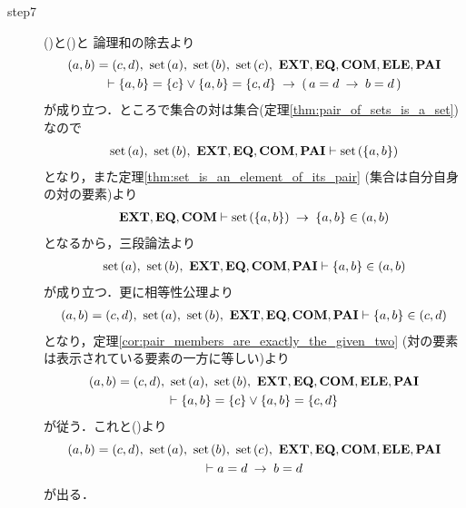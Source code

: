\begin{sketch}
\begin{description}
			\item[step7] ()と()と
				論理和の除去より
				\begin{align}
					\begin{gathered}
						(a,b) = (c,d),\ \set{a},\ \set{b},\ \set{c},\ \EXTAX,\EQAX,\COMAX,\ELEAX,\PAIAX \\
						\vdash \{a,b\} = \{c\} \vee \{a,b\} = \{c,d\} \rarrow (\, a = d \rarrow b = d\, )
					\end{gathered}
					\label{fom:equality_of_ordered_pairs_13}
				\end{align}
				が成り立つ．ところで集合の対は集合(定理\ref{thm:pair_of_sets_is_a_set})なので
				\begin{align}
					\operatorname*{set}\hspace{0.15em}(a),\ \operatorname*{set}\hspace{0.15em}(b),\ \mbox{{\bf EXT}},\mbox{{\bf EQ}},\mbox{\bf COM},\mbox{{\bf PAI}} \vdash \operatorname*{set}\hspace{0.15em}(\{a,b\})
				\end{align}
				となり，また定理\ref{thm:set_is_an_element_of_its_pair} (集合は自分自身の対の要素)より
				\begin{align}
					\mbox{{\bf EXT}},\mbox{{\bf EQ}},\mbox{\bf COM} \vdash \operatorname*{set}\hspace{0.15em}(\{a,b\}) \hspace{0.25em}\rightarrow\hspace{0.25em} \{a,b\} \in (a,b)	
				\end{align}
				となるから，三段論法より
				\begin{align}
					\operatorname*{set}\hspace{0.15em}(a),\ \operatorname*{set}\hspace{0.15em}(b),\ \mbox{{\bf EXT}},\mbox{{\bf EQ}},\mbox{\bf COM},\mbox{{\bf PAI}} \vdash \{a,b\} \in (a,b)
				\end{align}
				が成り立つ．更に相等性公理より
				\begin{align}
					(a,b) = (c,d),\ \set{a},\ \set{b},\ \EXTAX,\EQAX,\COMAX,\PAIAX \vdash \{a,b\} \in (c,d)
				\end{align}
				となり，定理\ref{cor:pair_members_are_exactly_the_given_two}
				(対の要素は表示されている要素の一方に等しい)より
				\begin{align}
					\begin{gathered}
						(a,b) = (c,d),\ \set{a},\ \set{b},\ \EXTAX,\EQAX,\COMAX,\ELEAX,\PAIAX \\
						\vdash \{a,b\} = \{c\} \vee \{a,b\} = \{c,d\}
					\end{gathered}
				\end{align}
				が従う．これと()より
				\begin{align}
					\begin{gathered}
						(a,b) = (c,d),\ \set{a},\ \set{b},\ \set{c},\ \EXTAX,\EQAX,\COMAX,\ELEAX,\PAIAX \\
						\vdash a = d \rarrow b = d
					\end{gathered}
					\label{fom:equality_of_ordered_pairs_14}
				\end{align}
				が出る．
				

\end{description}
\end{sketch}
